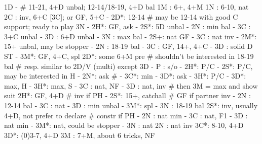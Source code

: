 1D -  # 11-21, 4+D unbal; 12-14/18-19, 4+D bal
1M : 6+, 4+M
1N : 6-10, nat
2C : inv, 6+C [3C]; or GF, 5+C
   - 2D*: 12-14  # may be 12-14 with good C support; ready to play 3N
        - 2H*: GF, ask
             - 2S*: 5D unbal
             - 2N : min bal
             - 3C : 3+C unbal
             - 3D : 6+D unbal
             - 3N : max bal
        - 2S+: nat GF
        - 3C : nat inv
   - 2M*: 15+ unbal, may be stopper
   - 2N : 18-19 bal
   - 3C : GF, 14+, 4+C
   - 3D : solid D ST
   - 3M*: GF, 4+C, spl
2D*: some 6+M pre  # shouldn't be interested in 18-19 bal
   # resp. similar to 2D/V (multi) except 3D
   - P  : s/o
   - 2H*: P/C
   - 2S*: P/C, may be interested in H
   - 2N*: ask  # 
        - 3C*: min
             - 3D*: ask
             - 3H*: P/C
        - 3D*: max, H
        - 3H*: max, S
   - 3C : nat, NF
   - 3D : nat, inv  # then 3M = max and show suit
2H*: GF, 4+D  # inv if PH
   - 2S*: 15+, catchall  # GF if partner inv
   - 2N : 12-14 bal
   - 3C : nat
   - 3D : min unbal
   - 3M*: spl
   - 3N : 18-19 bal
2S*: inv, usually 4+D, not prefer to declare  # constr if PH
   - 2N : nat min
   - 3C : nat, F1
   - 3D : nat min
   - 3M*: nat, could be stopper
   - 3N : nat
2N : nat inv
3C*: 8-10, 4+D
3D*: (0)3-7, 4+D
3M : 7+M, about 6 tricks, NF